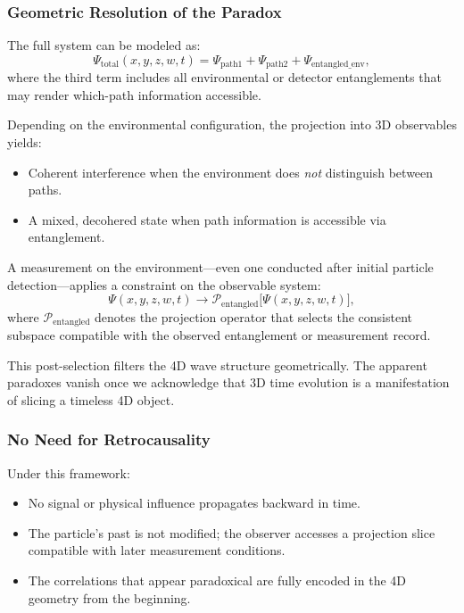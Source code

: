 \documentclass[12pt]{article}
\begin{document}
\subsubsection{Geometric Resolution of the Paradox}

The full system can be modeled as:
\begin{equation}
\Psi_{\mathrm{total}}(x, y, z, w, t) = \Psi_{\mathrm{path1}} + \Psi_{\mathrm{path2}} + \Psi_{\mathrm{entangled\_env}},
\end{equation}
where the third term includes all environmental or detector entanglements that may render which-path information accessible.

Depending on the environmental configuration, the projection into 3D observables yields:
\begin{itemize}
  \item Coherent interference when the environment does \emph{not} distinguish between paths.
  \item A mixed, decohered state when path information is accessible via entanglement.
\end{itemize}

A measurement on the environment—even one conducted after initial particle detection—applies a constraint on the observable system:
\begin{equation}
\Psi(x, y, z, w, t) \longrightarrow \mathcal{P}_{\mathrm{entangled}}\big[\Psi(x, y, z, w, t)\big],
\end{equation}
where \( \mathcal{P}_{\mathrm{entangled}} \) denotes the projection operator that selects the consistent subspace compatible with the observed entanglement or measurement record.

This post-selection filters the 4D wave structure geometrically. The apparent paradoxes vanish once we acknowledge that 3D time evolution is a manifestation of slicing a timeless 4D object.

\subsubsection{No Need for Retrocausality}

Under this framework:
\begin{itemize}
  \item No signal or physical influence propagates backward in time.
  \item The particle’s past is not modified; the observer accesses a projection slice compatible with later measurement conditions.
  \item The correlations that appear paradoxical are fully encoded in the 4D geometry from the beginning.
\end{itemize}
\end{document}
